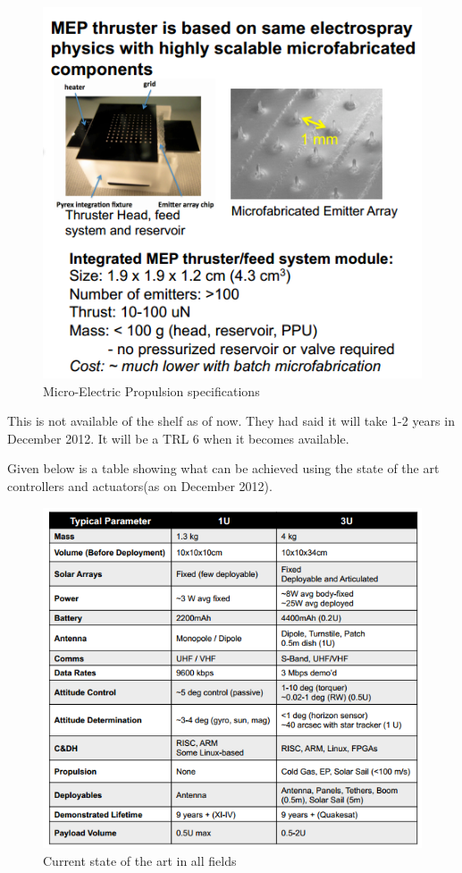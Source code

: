 \begin{figure}[!ht]
\begin{center}
\includegraphics[scale=0.7]{MEP_prop.png}
\caption{Micro-Electric Propulsion specifications}
\end{center}
\end{figure}

This is not available of the shelf as of now. They had said it will take 1-2 years in December 2012. It will be a TRL 6 when it becomes available.  

Given below is a table showing what can be achieved using the state of the art controllers and actuators(as on December 2012). 

\begin{figure}[!ht]
\begin{center}
\includegraphics[scale=0.7]{state_of_art.png}
\caption{Current state of the art in all fields}
\end{center}
\end{figure}